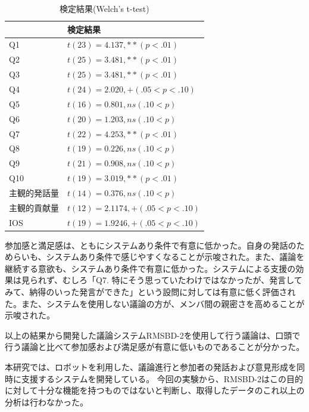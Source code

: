 \documentclass[11pt, a4paper]{jreport} %
\begin{document}
\begin{table}[]
\caption{検定結果(Welch's t-test)}
\centering
\label{tab:jikken2_kente}
\begin{tabular}{@{}ll@{}}
\toprule
\multicolumn{1}{c}{} & 検定結果                                 \\ \midrule
Q1                   & $t(23)= 4.137 ,    ** (p<.01)$     \\
Q2                   & $t(25)= 3.481 ,    ** (p<.01)$      \\
Q3                   & $t(25)= 3.481 ,    ** (p<.01)$      \\
Q4                   & $t(24)= 2.020 ,    +  (.05<p<.10)$ \\
Q5                   & $t(16)= 0.801 ,    ns (.10<p)$     \\
Q6                   & $t(20)= 1.203 ,    ns (.10<p)$      \\
Q7                   & $t(22)= 4.253 ,    ** (p<.01)$     \\
Q8                   & $t(19)= 0.226 ,    ns (.10<p)$     \\
Q9                   & $t(21)= 0.908 ,    ns (.10<p)$     \\
Q10                  & $t(19)= 3.019 ,    ** (p<.01)$      \\
主観的発話量               & $t(14)= 0.376 ,    ns (.10<p)$      \\
主観的貢献量               & $t(12)= 2.1174 ,    +  (.05<p<.10)$ \\
IOS                  & $t(19)= 1.9246 ,    +  (.05<p<.10)$ \\ \bottomrule
\end{tabular}
\end{table}


参加感と満足感は、ともにシステムあり条件で有意に低かった。自身の発話のためらいも、システムあり条件で感じやすくなることが示唆された。また、議論を継続する意欲も、システムあり条件で有意に低かった。システムによる支援の効果は見られず、むしろ「Q7. 特にそう思っていたわけではなかったが、発言してみて、納得のいった発言ができた」という設問に対しては有意に低く評価された。また、システムを使用しない議論の方が、メンバ間の親密さを高めることが示唆された。


以上の結果から開発した議論システムRMSBD-2を使用して行う議論は、口頭で行う議論と比べて参加感および満足感が有意に低いものであることが分かった。


本研究では、ロボットを利用した、議論進行と参加者の発話および意見形成を同時に支援するシステムを開発している。
今回の実験から、RMSBD-2はこの目的に対して十分な機能を持つものではないと判断し、取得したデータのこれ以上の分析は行わなかった。%
\end{document}
